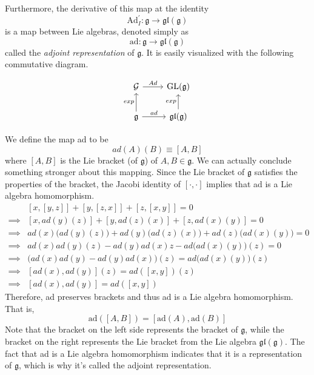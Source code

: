 \documentclass{article}
\DeclareMathOperator{\GL}{GL}
\begin{document}
    \begin{definition}
      Furthermore, the derivative of this map at the identity 
      \begin{equation}
        \text{Ad}_I^\prime: \mathfrak{g} \longrightarrow \mathfrak{gl}(\mathfrak{g})
      \end{equation}
      is a map between Lie algebras, denoted simply as 
      \begin{equation}
        \text{ad}: \mathfrak{g} \longrightarrow \mathfrak{gl}(\mathfrak{g})
      \end{equation}
      called the \textit{adjoint representation} of $\mathfrak{g}$. It is easily visualized with the following commutative diagram. 

      \[\begin{tikzcd}
      \mathcal{G} \arrow{r}{Ad} & \GL(\mathfrak{g}) \\
      \mathfrak{g} \arrow{u}{exp} \arrow{r}{ad} & \mathfrak{gl}(\mathfrak{g}) \arrow{u}{exp}
      \end{tikzcd}\]

      We define the map ad to be 
      \begin{equation}
        ad(A)(B) \equiv [A,B]
      \end{equation}
      where $[A,B]$ is the Lie bracket (of $\mathfrak{g}$) of $A, B \in \mathfrak{g}$. We can actually conclude something stronger about this mapping. Since the Lie bracket of $\mathfrak{g}$ satisfies the properties of the bracket, the Jacobi identity of $[\cdot, \cdot]$ implies that ad is a Lie algebra homomorphism. 
      \begin{align*}
        & [x, [y,z]] + [y,[z,x]] + [z, [x,y]] = 0 \\
        \implies & [x, ad(y)(z)] + [y, ad(z)(x)] + [z, ad(x)(y)] = 0 \\
        \implies & ad(x)\big(ad(y)(z)\big) + ad(y) \big( ad(z)(x)\big) + ad(z) \big(ad(x)(y)\big) = 0 \\
        \implies & ad(x) ad(y) (z) - ad(y) ad(x) z - ad \big(ad(x)(y)\big) (z) = 0 \\
        \implies & \big( ad(x) ad(y) - ad(y) ad(x) \big) (z) = ad\big( ad(x)(y) \big) (z) \\
        \implies & [ad(x), ad(y)] (z) = ad ([x,y]) (z) \\
        \implies & [ad(x), ad(y)] = ad([x,y])
      \end{align*}
      Therefore, ad preserves brackets and thus ad is a Lie algebra homomorphism. That is, 
      \begin{equation}
        \text{ad}([A,B]) = [\text{ad}(A), \text{ad}(B)]
      \end{equation}
      Note that the bracket on the left side represents the bracket of $\mathfrak{g}$, while the bracket on the right represents the Lie bracket from the Lie algebra $\mathfrak{gl}(\mathfrak{g})$. The fact that ad is a Lie algebra homomorphism indicates that it is a representation of $\mathfrak{g}$, which is why it's called the adjoint representation. 
    \end{definition}
\end{document}
